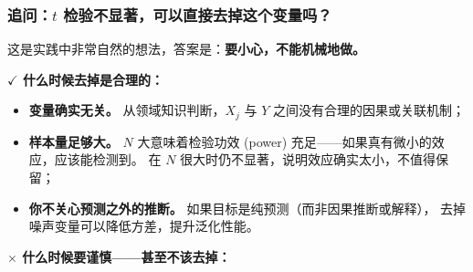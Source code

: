 \subsubsection{追问：$t$ 检验不显著，可以直接去掉这个变量吗？}

这是实践中非常自然的想法，答案是：\textbf{要小心，不能机械地做。}

\medskip
\noindent
\textbf{{\scriptsize $\checkmark$} 什么时候去掉是合理的：}

\begin{itemize}
    \item \textbf{变量确实无关。} 从领域知识判断，$X_j$ 与 $Y$ 之间没有合理的因果或关联机制；
    \item \textbf{样本量足够大。} $N$ 大意味着检验功效 (power) 充足——如果真有微小的效应，应该能检测到。
    在 $N$ 很大时仍不显著，说明效应确实太小，不值得保留；
    \item \textbf{你不关心预测之外的推断。} 如果目标是纯预测（而非因果推断或解释），
    去掉噪声变量可以降低方差，提升泛化性能。
\end{itemize}

\medskip
\noindent
\textbf{{\scriptsize $\times$} 什么时候要谨慎——甚至不该去掉：}

